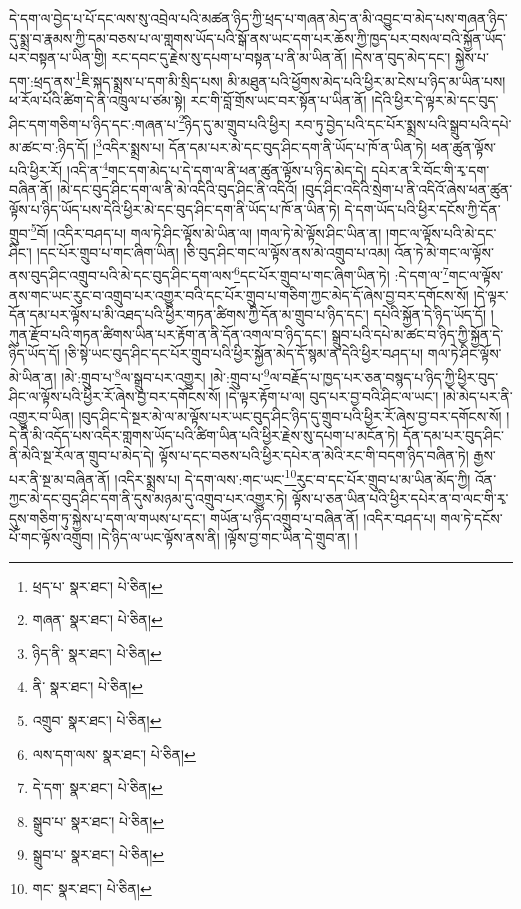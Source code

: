 དེ་དག་ལ་བྱེད་པ་པོ་དང་ལས་སུ་འབྲེལ་པའི་མཚན་ཉིད་ཀྱི་ཕྲད་པ་གཞན་མེད་ན་མི་འབྱུང་བ་མེད་པས་གཞན་ཉིད་དུ་སྨྲ་བ་རྣམས་ཀྱི་དམ་བཅས་པ་ལ་གླགས་ཡོད་པའི་སྒོ་ནས་ཡང་དག་པར་ཆོས་ཀྱི་ཁྱད་པར་བསལ་བའི་སྐྱོན་ཡོད་པར་བསྟན་པ་ཡིན་གྱི། རང་དབང་དུ་རྗེས་སུ་དཔག་པ་བསྟན་པ་ནི་མ་ཡིན་ནོ། །དེས་ན་བུད་མེད་དང་། སྐྱེས་པ་དག་:ཕྲད་ནས་\footnote{ཕྲད་པ་  སྣར་ཐང་།  པེ་ཅིན། }ཇི་སྐད་སྨྲས་པ་དག་མི་སྲིད་པས། མི་མཐུན་པའི་ཕྱོགས་མེད་པའི་ཕྱིར་མ་ངེས་པ་ཉིད་མ་ཡིན་པས། ཕ་རོལ་པོའི་ཚིག་དེ་ནི་འཁྲུལ་པ་ཙམ་སྟེ། རང་གི་བློ་གྲོས་ཡང་བར་སྟོན་པ་ཡིན་ནོ། །དེའི་ཕྱིར་དེ་ལྟར་མེ་དང་བུད་ཤིང་དག་གཅིག་པ་ཉིད་དང་:གཞན་པ་\footnote{གཞན་  སྣར་ཐང་།  པེ་ཅིན། }ཉིད་དུ་མ་གྲུབ་པའི་ཕྱིར། རབ་ཏུ་བྱེད་པའི་དང་པོར་སྨྲས་པའི་སྒྲུབ་པའི་དཔེ་མ་ཚང་བ་:ཉིད་དོ། །\footnote{ཉིད་ནི་  སྣར་ཐང་།  པེ་ཅིན། }འདིར་སྨྲས་པ། དོན་དམ་པར་མེ་དང་བུད་ཤིང་དག་ནི་ཡོད་པ་ཁོ་ན་ཡིན་ཏེ། ཕན་ཚུན་ལྟོས་པའི་ཕྱིར་རོ། །འདི་ན་\footnote{ནི་  སྣར་ཐང་།  པེ་ཅིན། }གང་དག་མེད་པ་དེ་དག་ལ་ནི་ཕན་ཚུན་ལྟོས་པ་ཉིད་མེད་དེ། དཔེར་ན་རི་བོང་གི་རྭ་དག་བཞིན་ནོ། །མེ་དང་བུད་ཤིང་དག་ལ་ནི་མེ་འདིའི་བུད་ཤིང་ནི་འདིའོ། །བུད་ཤིང་འདིའི་སྲེག་པ་ནི་འདིའོ་ཞེས་ཕན་ཚུན་ལྟོས་པ་ཉིད་ཡོད་པས་དེའི་ཕྱིར་མེ་དང་བུད་ཤིང་དག་ནི་ཡོད་པ་ཁོ་ན་ཡིན་ཏེ། དེ་དག་ཡོད་པའི་ཕྱིར་དངོས་ཀྱི་དོན་གྲུབ་\footnote{འགྲུབ་  སྣར་ཐང་།  པེ་ཅིན། }བོ། །འདིར་བཤད་པ། གལ་ཏེ་ཤིང་ལྟོས་མེ་ཡིན་ལ། །གལ་ཏེ་མེ་ལྟོས་ཤིང་ཡིན་ན། །གང་ལ་ལྟོས་པའི་མེ་དང་ཤིང་། །དང་པོར་གྲུབ་པ་གང་ཞིག་ཡིན། །ཅི་བུད་ཤིང་གང་ལ་ལྟོས་ནས་མེ་འགྲུབ་པ་འམ། འོན་ཏེ་མེ་གང་ལ་ལྟོས་ནས་བུད་ཤིང་འགྲུབ་པའི་མེ་དང་བུད་ཤིང་དག་ལས་\footnote{ལས་དག་ལས་  སྣར་ཐང་།  པེ་ཅིན། }དང་པོར་གྲུབ་པ་གང་ཞིག་ཡིན་ཏེ། :དེ་དག་ལ་\footnote{དེ་དག་  སྣར་ཐང་།  པེ་ཅིན། }གང་ལ་ལྟོས་ནས་གང་ཡང་རུང་བ་འགྲུབ་པར་འགྱུར་བའི་དང་པོར་གྲུབ་པ་གཅིག་ཀྱང་མེད་དོ་ཞེས་བྱ་བར་དགོངས་སོ། །དེ་ལྟར་དོན་དམ་པར་ལྟོས་པ་མི་འཐད་པའི་ཕྱིར་གཏན་ཚིགས་ཀྱི་དོན་མ་གྲུབ་པ་ཉིད་དང་། དཔེའི་སྐྱོན་དེ་ཉིད་ཡོད་དོ། །ཀུན་རྫོབ་པའི་གཏན་ཚིགས་ཡིན་པར་རྟོག་ན་ནི་དོན་འགལ་བ་ཉིད་དང་། སྒྲུབ་པའི་དཔེ་མ་ཚང་བ་ཉིད་ཀྱི་སྐྱོན་དེ་ཉིད་ཡོད་དོ། །ཅི་སྟེ་ཡང་བུད་ཤིང་དང་པོར་གྲུབ་པའི་ཕྱིར་སྐྱོན་མེད་དོ་སྙམ་ན་དེའི་ཕྱིར་བཤད་པ། གལ་ཏེ་ཤིང་ལྟོས་མེ་ཡིན་ན། །མེ་:གྲུབ་པ་\footnote{སྒྲུབ་པ་  སྣར་ཐང་།  པེ་ཅིན། }ལ་སྒྲུབ་པར་འགྱུར། །མེ་:གྲུབ་པ་\footnote{སྒྲུབ་པ་  སྣར་ཐང་།  པེ་ཅིན། }ལ་བརྗོད་པ་ཁྱད་པར་ཅན་བསྙད་པ་ཉིད་ཀྱི་ཕྱིར་བུད་ཤིང་ལ་ལྟོས་པའི་ཕྱིར་རོ་ཞེས་བྱ་བར་དགོངས་སོ། །དེ་ལྟར་རྟོག་པ་ལ། བུད་པར་བྱ་བའི་ཤིང་ལ་ཡང་། །མེ་མེད་པར་ནི་འགྱུར་བ་ཡིན། །བུད་ཤིང་དེ་སྔར་མེ་ལ་མ་ལྟོས་པར་ཡང་བུད་ཤིང་ཉིད་དུ་གྲུབ་པའི་ཕྱིར་རོ་ཞེས་བྱ་བར་དགོངས་སོ། །དེ་ནི་མི་འདོད་པས་འདིར་གླགས་ཡོད་པའི་ཚིག་ཡིན་པའི་ཕྱིར་རྗེས་སུ་དཔག་པ་མངོན་ཏེ། དོན་དམ་པར་བུད་ཤིང་ནི་མེའི་སྔ་རོལ་ན་གྲུབ་པ་མེད་དེ། ལྟོས་པ་དང་བཅས་པའི་ཕྱིར་དཔེར་ན་མེའི་རང་གི་བདག་ཉིད་བཞིན་ཏེ། རྒྱས་པར་ནི་སྔ་མ་བཞིན་ནོ། །འདིར་སྨྲས་པ། དེ་དག་ལས་:གང་ཡང་\footnote{གང་  སྣར་ཐང་།  པེ་ཅིན། }རུང་བ་དང་པོར་གྲུབ་པ་མ་ཡིན་མོད་ཀྱི། འོན་ཀྱང་མེ་དང་བུད་ཤིང་དག་ནི་དུས་མཉམ་དུ་འགྲུབ་པར་འགྱུར་ཏེ། ལྟོས་པ་ཅན་ཡིན་པའི་ཕྱིར་དཔེར་ན་བ་ལང་གི་རྭ་དུས་གཅིག་ཏུ་སྐྱེས་པ་དག་ལ་གཡས་པ་དང་། གཡོན་པ་ཉིད་འགྲུབ་པ་བཞིན་ནོ། །འདིར་བཤད་པ། གལ་ཏེ་དངོས་པོ་གང་ལྟོས་འགྲུབ། །དེ་ཉིད་ལ་ཡང་ལྟོས་ནས་ནི། །ལྟོས་བྱ་གང་ཡིན་དེ་གྲུབ་ན། །
